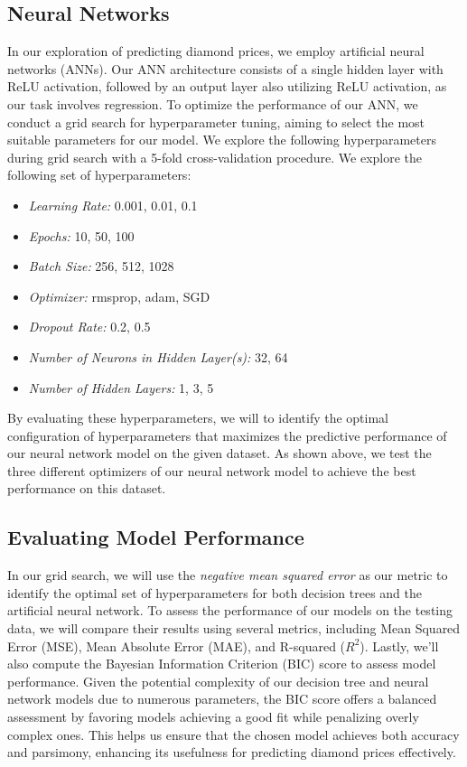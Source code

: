 \documentclass[conference]{IEEEtran}
\begin{document}
\subsection{Neural Networks}

In our exploration of predicting diamond prices, we employ artificial neural networks (ANNs). Our ANN architecture consists of a single hidden layer with ReLU activation, followed by an output layer also utilizing ReLU activation, as our task involves regression. To optimize the performance of our ANN, we conduct a grid search for hyperparameter tuning, aiming to select the most suitable parameters for our model. We explore the following hyperparameters during grid search with a 5-fold cross-validation procedure. We explore the following set of hyperparameters:

\begin{itemize}
    \item \emph{Learning Rate:} 0.001, 0.01, 0.1
    \item \emph{Epochs:} 10, 50, 100
    \item \emph{Batch Size:} 256, 512, 1028
    \item \emph{Optimizer:} rmsprop, adam, SGD
    \item \emph{Dropout Rate:} 0.2, 0.5
    \item \emph{Number of Neurons in Hidden Layer(s):} 32, 64
    \item \emph{Number of Hidden Layers:} 1, 3, 5
\end{itemize}

By evaluating these hyperparameters, we will to identify the optimal configuration of hyperparameters that maximizes the predictive performance of our neural network model on the given dataset. As shown above, we test the three different optimizers of our neural network model to achieve the best performance on this dataset.

\subsection{Evaluating Model Performance}

In our grid search, we will use the \emph{negative mean squared error} as our metric to identify the optimal set of hyperparameters for both decision trees and the artificial neural network. To assess the performance of our models on the testing data, we will compare their results using several metrics, including Mean Squared Error (MSE), Mean Absolute Error (MAE), and R-squared ($R^2$). Lastly, we'll also compute the Bayesian Information Criterion (BIC) score to assess model performance. Given the potential complexity of our decision tree and neural network models due to numerous parameters, the BIC score offers a balanced assessment by favoring models achieving a good fit while penalizing overly complex ones. This helps us ensure that the chosen model achieves both accuracy and parsimony, enhancing its usefulness for predicting diamond prices effectively.
\end{document}
